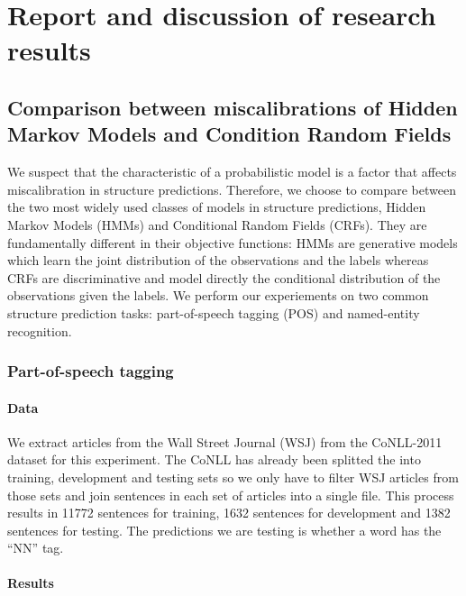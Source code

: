 \chapter{Report and discussion of research results}

\section{Comparison between miscalibrations of Hidden Markov Models and Condition Random Fields}

We suspect that the characteristic of a probabilistic model is a factor that affects miscalibration in structure predictions. Therefore, we choose to compare between the two most widely used classes of models in structure predictions, Hidden Markov Models (HMMs) and Conditional Random Fields (CRFs). They are fundamentally different in their objective functions: HMMs are generative models which learn the joint distribution of the observations and the labels whereas CRFs are discriminative and model directly the conditional distribution of the observations given the labels. We perform our experiements on two common structure prediction tasks: part-of-speech tagging (POS) and named-entity recognition. 

\subsection{Part-of-speech tagging}

\subsubsection{Data}

We extract articles from the Wall Street Journal (WSJ) from the CoNLL-2011 dataset for this experiment. The CoNLL has already been splitted the into training, development and testing sets so we only have to filter WSJ articles from those sets and join sentences in each set of articles into a single file. This process results in 11772 sentences for training, 1632 sentences for development and 1382 sentences for testing. The predictions we are testing is whether a word has the ``NN'' tag. 

\subsubsection{Results}

